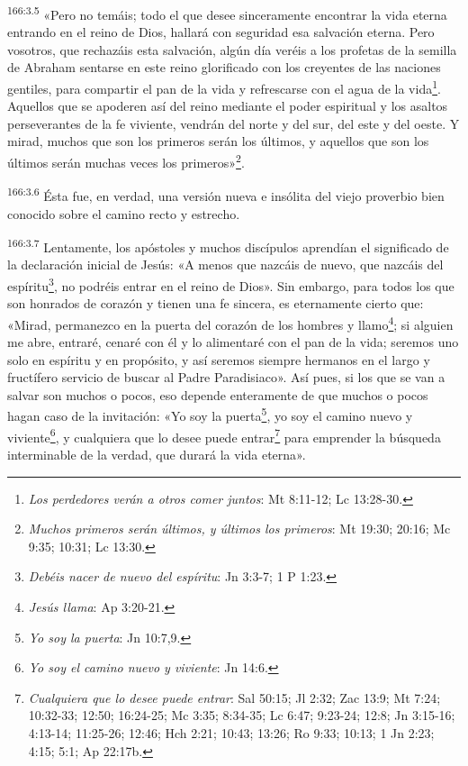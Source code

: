 \par
\textsuperscript{166:3.5} «Pero no temáis; todo el que desee sinceramente encontrar la vida eterna entrando en el reino de Dios, hallará con seguridad esa salvación eterna. Pero vosotros, que rechazáis esta salvación, algún día veréis a los profetas de la semilla de Abraham sentarse en este reino glorificado con los creyentes de las naciones gentiles, para compartir el pan de la vida y refrescarse con el agua de la vida\footnote{\textit{Los perdedores verán a otros comer juntos}: Mt 8:11-12; Lc 13:28-30.}. Aquellos que se apoderen así del reino mediante el poder espiritual y los asaltos perseverantes de la fe viviente, vendrán del norte y del sur, del este y del oeste. Y mirad, muchos que son los primeros serán los últimos, y aquellos que son los últimos serán muchas veces los primeros»\footnote{\textit{Muchos primeros serán últimos, y últimos los primeros}: Mt 19:30; 20:16; Mc 9:35; 10:31; Lc 13:30.}.

\par
\textsuperscript{166:3.6} Ésta fue, en verdad, una versión nueva e insólita del viejo proverbio bien conocido sobre el camino recto y estrecho.

\par
\textsuperscript{166:3.7} Lentamente, los apóstoles y muchos discípulos aprendían el significado de la declaración inicial de Jesús: «A menos que nazcáis de nuevo, que nazcáis del espíritu\footnote{\textit{Debéis nacer de nuevo del espíritu}: Jn 3:3-7; 1 P 1:23.}, no podréis entrar en el reino de Dios». Sin embargo, para todos los que son honrados de corazón y tienen una fe sincera, es eternamente cierto que: «Mirad, permanezco en la puerta del corazón de los hombres y llamo\footnote{\textit{Jesús llama}: Ap 3:20-21.}; si alguien me abre, entraré, cenaré con él y lo alimentaré con el pan de la vida; seremos uno solo en espíritu y en propósito, y así seremos siempre hermanos en el largo y fructífero servicio de buscar al Padre Paradisiaco». Así pues, si los que se van a salvar son muchos o pocos, eso depende enteramente de que muchos o pocos hagan caso de la invitación: «Yo soy la puerta\footnote{\textit{Yo soy la puerta}: Jn 10:7,9.}, yo soy el camino nuevo y viviente\footnote{\textit{Yo soy el camino nuevo y viviente}: Jn 14:6.}, y cualquiera que lo desee puede entrar\footnote{\textit{Cualquiera que lo desee puede entrar}: Sal 50:15; Jl 2:32; Zac 13:9; Mt 7:24; 10:32-33; 12:50; 16:24-25; Mc 3:35; 8:34-35; Lc 6:47; 9:23-24; 12:8; Jn 3:15-16; 4:13-14; 11:25-26; 12:46; Hch 2:21; 10:43; 13:26; Ro 9:33; 10:13; 1 Jn 2:23; 4:15; 5:1; Ap 22:17b.} para emprender la búsqueda interminable de la verdad, que durará la vida eterna».

